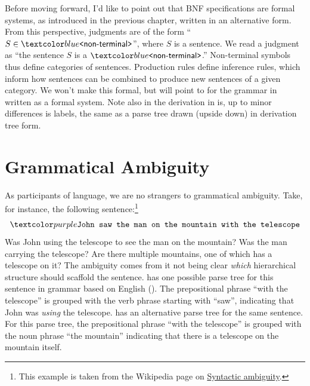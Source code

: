 \begin{remark}
  Before moving forward, I'd like to point out that BNF specifications are formal systems, as introduced in the previous chapter, written in an alternative form.
  From this perspective, judgments are of the form \enquote{$S \in \bnfnt{non-terminal}$}, where $S$ is a sentence.
  We read a judgment as \enquote{the sentence $S$ is a $\bnfnt{non-terminal}$.}
  Non-terminal symbols thus define categories of sentences.
  Production rules define inference rules, which inform how sentences can be combined to produce new sentences of a given category.
  We won't make this formal, but will point to  for the grammar in  written as a formal system.
  Note also in the derivation in  is, up to minor differences is labels, the same as a parse tree drawn (upside down) in derivation tree form.
\end{remark}

\section{Grammatical Ambiguity}

As participants of language, we are no strangers to grammatical ambiguity.
Take, for instance, the following sentence:\footnote{This example is taken from the Wikipedia page on \href{https://en.wikipedia.org/wiki/Syntactic_ambiguity}{Syntactic ambiguity}.}
\begin{align*}
  \bnft{John saw the man on the mountain with the telescope}
\end{align*}
%
Was John using the telescope to see the man on the mountain?
Was the man carrying the telescope?
Are there multiple mountains, one of which has a telescope on it?
The ambiguity comes from it not being clear \textit{which} hierarchical structure should scaffold the sentence.
 has one possible parse tree for this sentence in grammar based on English ().
The prepositional phrase \enquote{with the telescope} is grouped with the verb phrase starting with \enquote{saw}, indicating that John was \textit{using} the telescope.
 has an alternative parse tree for the same sentence.
For this parse tree, the prepositional phrase \enquote{with the telescope} is grouped with the noun phrase \enquote{the mountain} indicating that there is a telescope on the mountain itself.

